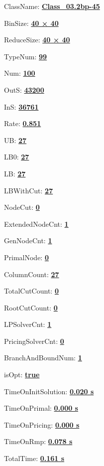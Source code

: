 \documentclass[11pt]{article}
\begin{document}
\pagestyle{empty}


ClassName: \underline{\textbf{Class_03.2bp-45}}
\par
BinSize: \underline{\textbf{40 × 40}}
\par
ReduceSize: \underline{\textbf{40 × 40}}
\par
TypeNum: \underline{\textbf{99}}
\par
Num: \underline{\textbf{100}}
\par
OutS: \underline{\textbf{43200}}
\par
InS: \underline{\textbf{36761}}
\par
Rate: \underline{\textbf{0.851}}
\par
UB: \underline{\textbf{27}}
\par
LB0: \underline{\textbf{27}}
\par
LB: \underline{\textbf{27}}
\par
LBWithCut: \underline{\textbf{27}}
\par
NodeCut: \underline{\textbf{0}}
\par
ExtendedNodeCnt: \underline{\textbf{1}}
\par
GenNodeCnt: \underline{\textbf{1}}
\par
PrimalNode: \underline{\textbf{0}}
\par
ColumnCount: \underline{\textbf{27}}
\par
TotalCutCount: \underline{\textbf{0}}
\par
RootCutCount: \underline{\textbf{0}}
\par
LPSolverCnt: \underline{\textbf{1}}
\par
PricingSolverCnt: \underline{\textbf{0}}
\par
BranchAndBoundNum: \underline{\textbf{1}}
\par
isOpt: \underline{\textbf{true}}
\par
TimeOnInitSolution: \underline{\textbf{0.020 s}}
\par
TimeOnPrimal: \underline{\textbf{0.000 s}}
\par
TimeOnPricing: \underline{\textbf{0.000 s}}
\par
TimeOnRmp: \underline{\textbf{0.078 s}}
\par
TotalTime: \underline{\textbf{0.161 s}}
\par
\newpage


\end{document}
